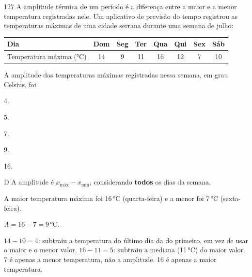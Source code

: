 \begin{questaoinedita}{1}{27}
A amplitude térmica de um período é a diferença entre a maior e a menor temperatura registradas
nele. Um aplicativo de previsão do tempo registrou as temperaturas máximas de uma cidade serrana
durante uma semana de julho:
\begin{center}
\begin{tabular}{lccccccc}
\toprule
Dia & Dom & Seg & Ter & Qua & Qui & Sex & Sáb \\ \midrule
Temperatura máxima (°C) & 14 & 9 & 11 & 16 & 12 & 7 & 10 \\ \bottomrule
\end{tabular}
\end{center}
A amplitude das temperaturas máximas registradas nessa semana, em grau Celsius, foi
\begin{alternativas*}[5]
\item 4.
\item 5.
\item 7.
\item 9.
\item 16.
\end{alternativas*}
\end{questaoinedita}
\begin{resolucao}{D}
 A amplitude é $x_{\text{máx}} - x_{\text{mín}}$, considerando
\textbf{todos} os dias da semana.

 A maior temperatura máxima foi 16\,°C (quarta-feira) e a menor
foi 7\,°C (sexta-feira).

 $A = 16 - 7 = 9$\,°C.

\begin{distratores}
 $14 - 10 = 4$: subtraiu a temperatura do último dia da do primeiro, em vez de usar o maior e o
menor valor.
 $16 - 11 = 5$: subtraiu a mediana (11\,°C) do maior valor.
 7 é apenas a menor temperatura, não a amplitude.
 16 é apenas a maior temperatura.
\end{distratores}
\end{resolucao}

